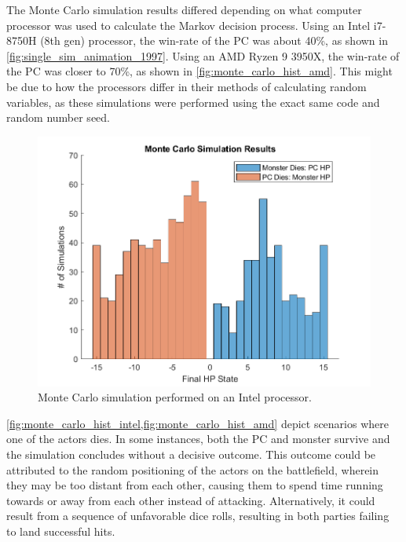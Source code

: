 \documentclass[letterpaper, 10 pt, conference]{ieeeconf}
\begin{document}
The Monte Carlo simulation results differed depending on what computer processor was used to calculate the Markov decision 
process. Using an Intel i7-8750H (8th gen) processor, the win-rate of the PC was about 40\%, as shown in \cref{fig:single_sim_animation_1997}. 
Using an AMD Ryzen 9 3950X, the win-rate of the PC was closer to 70\%, as shown in \cref{fig:monte_carlo_hist_amd}. 
This might be due to how the processors differ in their methods of calculating random variables, as these simulations were performed using the exact same code and random number seed.

\begin{figure}[thb]
    \centering
    \includegraphics[scale = 0.5]{figs/DND_monte_carlo_hist.png}
    \caption{Monte Carlo simulation performed on an Intel processor.}
    \label{fig:monte_carlo_hist_intel}
\end{figure}


\cref{fig:monte_carlo_hist_intel,fig:monte_carlo_hist_amd} depict scenarios where one of the actors dies. 
In some instances, both the PC and monster survive and the simulation concludes without a decisive outcome. 
This outcome could be attributed to the random positioning of the actors on the battlefield, wherein they may be too distant from each other, causing them to spend time running towards or away from each other instead of attacking. 
Alternatively, it could result 
from a sequence of unfavorable dice rolls, resulting in both parties failing to land successful hits.
\end{document}
